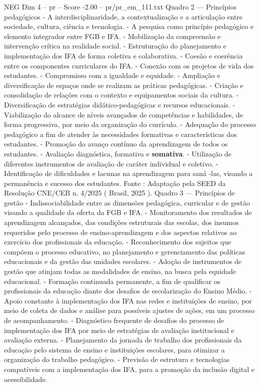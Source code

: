 \begin{textsample}{NEG Dim 4 – pr – Score -2.00 – pr/pr\_em\_111.txt}
Quadro 2 — Princípios pedagógicos - A interdisciplinaridade, a contextualização e a articulação entre sociedade, cultura, ciência e tecnologia. - A pesquisa como princípio pedagógico e elemento integrador entre FGB e IFA. - Mobilização da compreensão e intervenção crítica na realidade social. - Estruturação do planejamento e implementação dos IFA de forma coletiva e colaborativa. - Coesão e coerência entre os componentes curriculares do IFA. - Conexão com os projetos de vida dos estudantes. - Compromisso com a igualdade e equidade. - Ampliação e diversificação de espaços onde se realizam as práticas pedagógicas. - Criação e consolidação de relações com o contexto e equipamentos sociais da cultura. - Diversificação de estratégias didático-pedagógicas e recursos educacionais. - Viabilização do alcance de níveis avançados de competências e habilidades, de forma progressiva, por meio da organização do currículo. - Adequação do processo pedagógico a fim de atender às necessidades formativas e características dos estudantes. - Promoção do avanço contínuo da aprendizagem de todos os estudantes. - Avaliação diagnóstica, formativa e \textbf{somativa}. - Utilização de diferentes instrumentos de avaliação de caráter individual e coletivo. - Identificação de dificuldades e lacunas na aprendizagem para saná -las, visando a permanência e sucesso dos estudantes.
Fonte : Adaptação pela SEED da Resolução CNE/CEB n. 4/2025 ( Brasil, 2025 ).
Quadro 3 — Princípios de gestão - Indissociabilidade entre as dimensões pedagógica, curricular e de gestão visando a qualidade da oferta da FGB e IFA. - Monitoramento dos resultados de aprendizagem alcançados, das condições estruturais das escolas, dos insumos requeridos pelo processo de ensino-aprendizagem e dos aspectos relativos ao exercício dos profissionais da educação. - Reconhecimento dos sujeitos que compõem o processo educativo, no planejamento e gerenciamento das políticas educacionais e da gestão das unidades escolares. - Adoção de instrumentos de gestão que atinjam todas as modalidades de ensino, na busca pela equidade educacional. - Formação continuada permanente, a fim de qualificar os profissionais da educação diante dos desafios de escolarização do Ensino Médio. - Apoio constante à implementação dos IFA nas redes e instituições de ensino, por meio de coleta de dados e análise para possíveis ajustes de ações, em um processo de acompanhamento. - Diagnóstico frequente de desafios do processo de implementação dos IFA por meio de estratégias de avaliação institucional e avaliação externa. - Planejamento da jornada de trabalho dos profissionais da educação pelo sistema de ensino e instituições escolares, para otimizar a organização do trabalho pedagógico. - Previsão de estrutura e tecnologias compatíveis com a implementação dos IFA, para a promoção da inclusão digital e acessibilidade.

\end{textsample}
